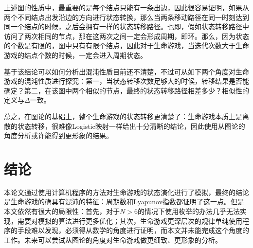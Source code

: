 \documentclass[a4paper,12pt]{article}
\begin{document}
上述图的性质中，最重要的是每个结点只能有一条出边，因此很容易证明，如果从两个不同结点出发沿边的方向进行状态转换，那么当两条移动路径在同一时刻达到同一个结点的时候，之后会拥有一样的状态转移路径。也即，假如状态转移路径中访问了两次相同的节点，那在这两次之间一定会形成周期，即环。那么，因为状态的个数是有限的，图中只有有限个结点，因此对于生命游戏，当迭代次数大于生命游戏的结点个数的时候，一定会进入周期状态。

基于该结论可以如何分析出混沌性质目前还不清楚，不过可从如下两个角度对生命游戏的混沌性质进行探究：第一，当状态转移次数足够大的时候，转移结果是否能确定？第二，在该图中两个相似的节点，最终的状态转移路径相差多少？相似性的定义与$\Delta$一致。

总之，在图论的基础上，整个生命游戏的状态转移更清楚了：生命游戏本质上是离散的状态转移，很难像Logistic映射一样给出十分清晰的结论，因此使用从图论的角度分析或许能得到更形象的结果。

\section{结论}

本论文通过使用计算机程序的方法对生命游戏的状态演化进行了模拟，最终的结论是生命游戏的确具有混沌的特征：周期数和Lyapunov指数都证明了这一点。但是本文依然有很大的局限性：首先，对于$N>6$的情况下使用枚举的办法几乎无法实现，需要对模拟的算法进行更多优化；其次，生命游戏更深层次的规律单纯使用程序的手段难以发现，必须得从数学的角度进行证明，而本文并未能完成这个角度的工作。未来可以尝试从图论的角度对生命游戏做更细致、更形象的分析。

\newpage
\printbibliography
\end{document}
